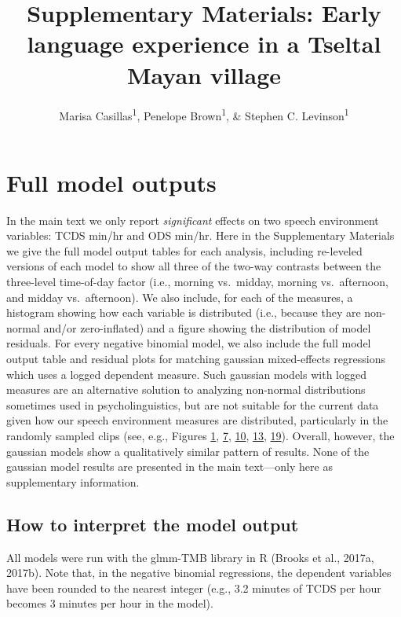 \documentclass[floatsintext,man]{apa6}
\title{Supplementary Materials: Early language experience in a Tseltal Mayan
village}
\author{Marisa Casillas\textsuperscript{1}, Penelope Brown\textsuperscript{1}, \& Stephen C. Levinson\textsuperscript{1}}
\affiliation{
    \vspace{0.5cm}
          \textsuperscript{1} Max Planck Institute for Psycholinguistics  }
\theoremstyle{definition}
\theoremstyle{definition}
\theoremstyle{definition}
\theoremstyle{remark}
\begin{document}
\maketitle

\setcounter{secnumdepth}{0}



\section{Full model outputs}\label{models}

In the main text we only report \emph{significant} effects on two speech
environment variables: TCDS min/hr and ODS min/hr. Here in the
Supplementary Materials we give the full model output tables for each
analysis, including re-leveled versions of each model to show all three
of the two-way contrasts between the three-level time-of-day factor
(i.e., morning vs.~midday, morning vs.~afternoon, and midday
vs.~afternoon). We also include, for each of the measures, a histogram
showing how each variable is distributed (i.e., because they are
non-normal and/or zero-inflated) and a figure showing the distribution
of model residuals. For every negative binomial model, we also include
the full model output table and residual plots for matching gaussian
mixed-effects regressions which uses a logged dependent measure. Such
gaussian models with logged measures are an alternative solution to
analyzing non-normal distributions sometimes used in psycholinguistics,
but are not suitable for the current data given how our speech
environment measures are distributed, particularly in the randomly
sampled clips (see, e.g., Figures \protect\hyperlink{fig1}{1},
\protect\hyperlink{fig7}{7}, \protect\hyperlink{fig10}{10},
\protect\hyperlink{fig13}{13}, \protect\hyperlink{fig19}{19}). Overall,
however, the gaussian models show a qualitatively similar pattern of
results. None of the gaussian model results are presented in the main
text---only here as supplementary information.

\subsection{How to interpret the model
output}\label{how-to-interpret-the-model-output}

All models were run with the glmm-TMB library in R (Brooks et al.,
2017a, 2017b). Note that, in the negative binomial regressions, the
dependent variables have been rounded to the nearest integer (e.g., 3.2
minutes of TCDS per hour becomes 3 minutes per hour in the model).
\end{document}
